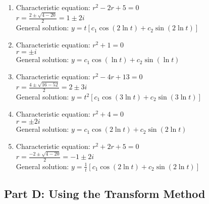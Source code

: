 \documentclass[12pt]{article}
\begin{document}
\begin{enumerate}[resume]
\item Characteristic equation: $r^{2} - 2r + 5 = 0$\\
$r = \frac{2 \pm \sqrt{4-20}}{2} = 1 \pm 2i$\\
General solution: $y = t[c_{1}\cos(2\ln t) + c_{2}\sin(2\ln t)]$

\item Characteristic equation: $r^{2} + 1 = 0$\\
$r = \pm i$\\
General solution: $y = c_{1}\cos(\ln t) + c_{2}\sin(\ln t)$

\item Characteristic equation: $r^{2} - 4r + 13 = 0$\\
$r = \frac{4 \pm \sqrt{16-52}}{2} = 2 \pm 3i$\\
General solution: $y = t^{2}[c_{1}\cos(3\ln t) + c_{2}\sin(3\ln t)]$

\item Characteristic equation: $r^{2} + 4 = 0$\\
$r = \pm 2i$\\
General solution: $y = c_{1}\cos(2\ln t) + c_{2}\sin(2\ln t)$

\item Characteristic equation: $r^{2} + 2r + 5 = 0$\\
$r = \frac{-2 \pm \sqrt{4-20}}{2} = -1 \pm 2i$\\
General solution: $y = \frac{1}{t}[c_{1}\cos(2\ln t) + c_{2}\sin(2\ln t)]$
\end{enumerate}

\subsection*{Part D: Using the Transform Method}
\end{document}
